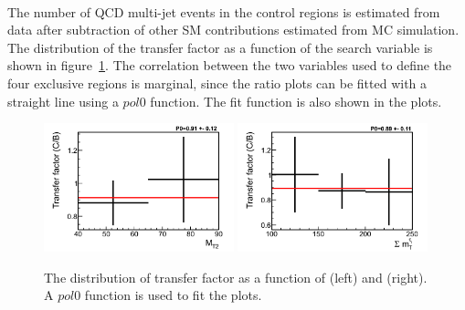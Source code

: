 \\The number of QCD multi-jet events in the control regions is estimated from data after subtraction 
of other SM contributions estimated from MC simulation. The distribution of the transfer factor as a 
function of the search variable is shown in figure~\ref{fig:1QCDbg}. The correlation 
between the two variables used to define the four exclusive regions is marginal, since the ratio plots can be fitted with a straight line using a $pol0$ function. The fit function is also shown in the plots.\\ 
\begin{figure}[!Hhtb]
\centering
\includegraphics[width=0.49\textwidth]{QCDbginTauTau/Bin1-transferfactor.png}
\includegraphics[width=0.49\textwidth]{QCDbginTauTau/Bin2-transferfactor.png} \\
\caption{The distribution of transfer factor as a function of \mttwo (left) and \SumMT (right). A $pol0$ function is used to fit the plots.}
\label{fig:1QCDbg}
\end{figure}

